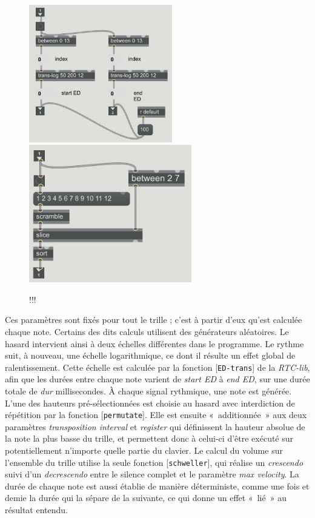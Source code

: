 \documentclass[a4paper,12pt]{article}
\newcommand{\guill}[1]{«~#1~»}
\newcommand{\patch}[1]{[\texttt{#1}]}
\begin{document}
\begin{figure}[h!]
\begin{center}
\includegraphics[height=6cm]{images/trillerED.jpg}~~~\includegraphics[height=6cm]{images/trillernotes.jpg}
\label{trillerf}
\caption{\footnotesize !!!}
\end{center}
\end{figure}

Ces paramètres sont fixés pour tout le trille ; c'est à partir d'eux qu'est calculée chaque note. Certains des dits calculs utilisent des générateurs aléatoires. Le hasard intervient ainsi à deux échelles différentes dans le programme. Le rythme suit, à nouveau, une échelle logarithmique, ce dont il résulte un effet global de ralentissement. Cette échelle est calculée par la fonction \patch{ED-trans} de la \emph{RTC-lib}, afin que les durées entre chaque note varient de \emph{start ED} à \emph{end ED}, sur une durée totale de \emph{dur} millisecondes. À chaque signal rythmique, une note est générée. L'une des hauteurs pré-sélectionnées est choisie au hasard avec interdiction de répétition par la fonction \patch{permutate}. Elle est ensuite \guill{additionnée} aux deux paramètres \emph{transposition interval} et \emph{register} qui définissent la hauteur absolue de la note la plus basse du trille, et permettent donc à celui-ci d'être exécuté sur potentiellement n'importe quelle partie du clavier. Le calcul du volume sur l'ensemble du trille utilise la seule fonction \patch{schweller}, qui réalise un \emph{crescendo} suivi d'un \emph{decrescendo} entre le silence complet et le paramètre \emph{max velocity}. La durée de chaque note est aussi établie de manière déterministe, comme une fois et demie la durée qui la sépare de la suivante, ce qui donne un effet \guill{lié} au résultat entendu.
\end{document}
